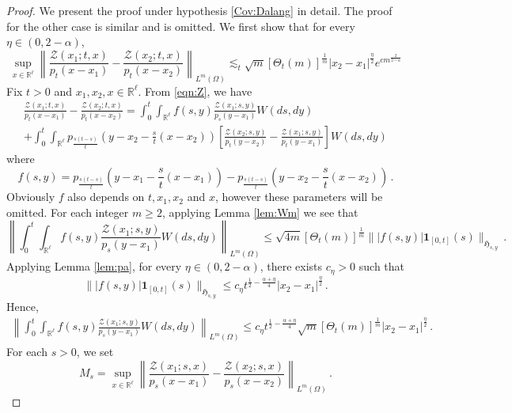 \documentclass[12pt,reqno]{amsart}
\theoremstyle{remark}
\newcommand{\1}{\mathbf{1}}
\def\RR{\mathbb{R}}
\def\HH{\mathfrak{H}}
\def\Z{\mathcal{Z}}
\def\lt{\left}
\def\rt{\right}
\def\HH{\mathfrak{H}}
\begin{document}
	\begin{proof}
		We present the proof under hypothesis \ref{Cov:Dalang} in detail. The proof for the other case is similar and is omitted.	We first show that for every $\eta\in(0,2- \alpha)$,
		\begin{equation}\label{tmp:estZ1}
			\sup_{x\in\RR^\ell}\lt\|\frac{\Z(x_1;t,x)}{p_t(x-x_1)}-\frac{\Z(x_2;t,x)}{p_t(x-x_2)}\rt\|_{L^m(\Omega)}
			\lesssim_t \sqrt m[\Theta_t(m)]^{\frac1m}|x_2-x_1|^{\frac\eta2} e^{cm^{\frac{2}{2-\alpha}}}
		\end{equation}
		Fix $t>0$ and $x_1,x_2,x\in\RR^\ell$. From \eqref{eqn:Z}, we have
		\begin{multline}\label{tmp:Z1}
			\frac{\Z(x_1;t,x)}{p_t(x-x_1)}-\frac{\Z(x_2;t,x)}{p_t(x-x_2)}
			=\int_0^t\int_{\RR^\ell} f(s,y) \frac{\Z(x_1;s,y)}{p_s(y-x_1)} W(ds,dy)
			\\+\int_0^t\int_{\RR^\ell}p_{\frac{s(t-s)}t}\lt(y-x_2-\frac st(x-x_2) \rt)
			\lt[\frac{\Z(x_2;s,y)}{p_t(y-x_2)}-\frac{\Z(x_1;s,y)}{p_t(y-x_1)}\rt]W(ds,dy)
		\end{multline}
		where
		\begin{equation*}
			f(s,y)=p_{\frac{s(t-s)}{t}} \left(y-x_1-\frac{s}{t}(x-x_1)\right) - p_{\frac{s(t-s)}{t}}\left(y-x_2-\frac{s}{t}(x-x_2)\right)\,.
		\end{equation*}
		Obviously $f$ also depends on $t,x_1,x_2$ and $x$, however these parameters will be omitted.
		For each integer $m\ge2$, applying Lemma \ref{lem:Wm} we see that
		\begin{equation*}
			\lt\|\int_0^t\int_{\RR^\ell} f(s,y) \frac{\Z(x_1;s,y)}{p_s(y-x_1)} W(ds,dy)\rt\|_{L^m(\Omega)}
			\leq\sqrt{4m} [\Theta_t(m)]^{\frac1m}\||f(s,y)| \1_{[0,t]}(s) \|_{\HH_{s,y}} \,. 
		\end{equation*}
		Applying Lemma \ref{lem:pa}, for every $\eta\in(0,2- \alpha)$, there exists $c_{\eta}>0$ such that
		\begin{equation*}
			\||f(s,y)| \1_{[0,t]}(s) \|_{\HH_{s,y}}\le c_{\eta}t^{\frac12-\frac{\alpha+\eta}4}  |x_2-x_1|^{\frac\eta2}\,.
		\end{equation*}
		Hence,
		\begin{align}\label{tmp:extZ2}
			\lt\|\int_0^t\int_{\RR^\ell} f(s,y) \frac{\Z(x_1;s,y)}{p_s(y-x_1)} W(ds,dy)\rt\|_{L^m(\Omega)}
			\le c_{\eta}t^{\frac12-\frac{\alpha+\eta}4} \sqrt m[\Theta_t(m)]^{\frac1m}|x_2-x_1|^{\frac\eta2}\,.
		\end{align}
		For each $s>0$, we set
		\begin{equation*}
			M_s=\sup_{x\in\RR^\ell}\lt\|\frac{\Z(x_1;s,x)}{p_s(x-x_1)}-\frac{\Z(x_2;s,x)}{p_s(x-x_2)}\rt\|_{L^m(\Omega)}\,.

\end{equation*}
\end{proof}
\end{document}
